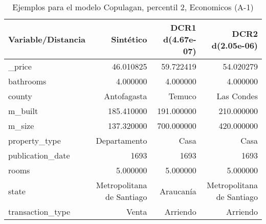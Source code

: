\begin{table}[H]
\centering
\fontsize{10}{14}\selectfont
\caption{Ejemplos para el modelo Copulagan, percentil 2, Economicos (A-1)}
\label{table-example-economicos-a-1-copulagan-2p}
\begin{tabular}{|l|r|r|r|}
\hline
\rowcolor[gray]{0.8}
Variable/Distancia & Sintético & DCR1 d(4.67e-07) & DCR2 d(2.05e-06) \\
\hline \_price & \cellcolor[rgb]{0.9, 0.54, 0.52} 46.010825 & 59.722419 & 54.020279 \\
\hline bathrooms & \cellcolor[rgb]{0.9, 0.54, 0.52} 4.000000 & \cellcolor[rgb]{0.9, 0.54, 0.52} 4.000000 & \cellcolor[rgb]{0.9, 0.54, 0.52} 4.000000 \\
\hline county & \cellcolor[rgb]{0.9, 0.54, 0.52} Antofagasta & Temuco & Las Condes \\
\hline m\_built & \cellcolor[rgb]{0.9, 0.54, 0.52} 185.410000 & 191.000000 & 210.000000 \\
\hline m\_size & \cellcolor[rgb]{0.9, 0.54, 0.52} 137.320000 & 700.000000 & 420.000000 \\
\hline property\_type & \cellcolor[rgb]{0.9, 0.54, 0.52} Departamento & Casa & Casa \\
\hline publication\_date & \cellcolor[rgb]{0.9, 0.54, 0.52} 1693 & \cellcolor[rgb]{0.9, 0.54, 0.52} 1693 & \cellcolor[rgb]{0.9, 0.54, 0.52} 1693 \\
\hline rooms & \cellcolor[rgb]{0.9, 0.54, 0.52} 5.000000 & \cellcolor[rgb]{0.9, 0.54, 0.52} 5.000000 & \cellcolor[rgb]{0.9, 0.54, 0.52} 5.000000 \\
\hline state & \cellcolor[rgb]{0.9, 0.54, 0.52} Metropolitana de Santiago & Araucanía & \cellcolor[rgb]{0.9, 0.54, 0.52} Metropolitana de Santiago \\
\hline transaction\_type & \cellcolor[rgb]{0.9, 0.54, 0.52} Venta & Arriendo & Arriendo \\
\hline
\end{tabular}
\end{table}
